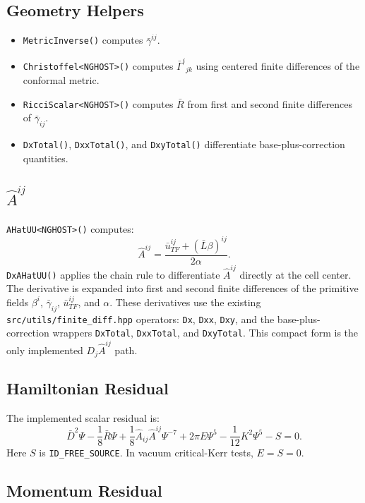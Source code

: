 \documentclass[11pt]{article}
\newcommand{\file}[1]{\nolinkurl{#1}}
\newcommand{\code}[1]{\texttt{#1}}
\begin{document}
\subsection{Geometry Helpers}

\begin{itemize}
  \item \code{MetricInverse()} computes \(\bar{\gamma}^{ij}\).
  \item \code{Christoffel<NGHOST>()} computes \(\bar{\Gamma}^i{}_{jk}\) using
        centered finite differences of the conformal metric.
  \item \code{RicciScalar<NGHOST>()} computes \(\bar{R}\) from first and second
        finite differences of \(\bar{\gamma}_{ij}\).
  \item \code{DxTotal()}, \code{DxxTotal()}, and \code{DxyTotal()} differentiate
        base-plus-correction quantities.
\end{itemize}

\subsection{\(\hat{A}^{ij}\)}

\code{AHatUU<NGHOST>()} computes:
\[
  \hat{A}^{ij} =
  \frac{\bar{u}^{ij}_{TF} + (\bar{L}\beta)^{ij}}{2\alpha}.
\]
\code{DxAHatUU()} applies the chain rule to differentiate \(\hat{A}^{ij}\)
directly at the cell center.  The derivative is expanded into first and second
finite differences of the primitive fields \(\beta^i\), \(\bar{\gamma}_{ij}\),
\(\bar{u}^{ij}_{TF}\), and \(\alpha\).  These derivatives use the existing
\file{src/utils/finite\_diff.hpp} operators: \code{Dx}, \code{Dxx}, \code{Dxy},
and the base-plus-correction wrappers \code{DxTotal}, \code{DxxTotal}, and
\code{DxyTotal}.  This compact form is the only implemented
\(D_j\hat{A}^{ij}\) path.

\subsection{Hamiltonian Residual}

The implemented scalar residual is:
\[
  \bar{D}^2\Psi
  - \frac{1}{8}\bar{R}\Psi
  + \frac{1}{8}\hat{A}_{ij}\hat{A}^{ij}\Psi^{-7}
  + 2\pi E\Psi^5
  - \frac{1}{12}K^2\Psi^5
  - S = 0.
\]
Here \(S\) is \code{ID\_FREE\_SOURCE}.  In vacuum critical-Kerr tests,
\(E=S=0\).

\subsection{Momentum Residual}
\end{document}
